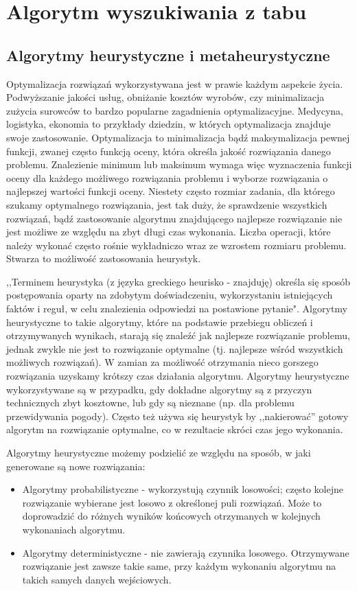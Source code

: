 

\chapter{Algorytm wyszukiwania z tabu}
\section{Algorytmy heurystyczne i metaheurystyczne}
 Optymalizacja rozwiązań wykorzystywana jest w prawie każdym aspekcie życia. Podwyższanie jakości usług, obniżanie kosztów wyrobów, czy minimalizacja zużycia surowców to bardzo popularne zagadnienia optymalizacyjne. Medycyna, logistyka, ekonomia to przykłady dziedzin, w których optymalizacja znajduje swoje zastosowanie. 
 Optymalizacja to minimalizacja bądź maksymalizacja pewnej funkcji, zwanej często funkcją oceny, która określa jakość rozwiązania danego problemu. Znalezienie minimum lub maksimum wymaga więc wyznaczenia funkcji oceny dla każdego możliwego rozwiązania problemu i wyborze rozwiązania o najlepszej wartości funkcji oceny. Niestety często rozmiar zadania, dla którego szukamy optymalnego rozwiązania, jest tak duży, że sprawdzenie wszystkich rozwiązań, bądź zastosowanie algorytmu znajdującego najlepsze rozwiązanie nie jest możliwe ze względu na zbyt długi czas wykonania. Liczba operacji, które należy wykonać często rośnie wykładniczo wraz ze wzrostem rozmiaru problemu. Stwarza to możliwość zastosowania heurystyk.
 
 ,,Terminem heurystyka (z języka greckiego heurisko - znajduję) określa się sposób postępowania oparty na zdobytym doświadczeniu, wykorzystaniu istniejących faktów i reguł, w celu znalezienia odpowiedzi na postawione pytanie"\cite{Algorytmy:Widuch}. Algorytmy heurystyczne to takie algorytmy, które na podstawie przebiegu obliczeń i otrzymywanych wynikach, starają się znaleźć jak najlepsze rozwiązanie problemu, jednak zwykle nie jest to rozwiązanie optymalne (tj. najlepsze wśród wszystkich możliwych rozwiązań). W zamian za możliwość otrzymania nieco gorszego rozwiązania uzyskamy krótszy czas działania algorytmu. Algorytmy heurystyczne wykorzystywane są w przypadku, gdy dokładne algorytmy są z przyczyn technicznych zbyt kosztowne, lub gdy są nieznane (np. dla problemu przewidywania pogody). Często też używa się heurystyk by ,,nakierować'' gotowy algorytm na rozwiązanie optymalne, co w rezultacie skróci czas jego wykonania.
 
 Algorytmy heurystyczne możemy podzielić ze względu na sposób, w jaki generowane są nowe rozwiązania:
 \begin{itemize}
 	\item Algorytmy probabilistyczne - wykorzystują czynnik losowości; często kolejne rozwiązanie wybierane jest losowo z określonej puli rozwiązań. Może to doprowadzić do różnych wyników końcowych otrzymanych w kolejnych wykonaniach algorytmu.
 	\item Algorytmy deterministyczne - nie zawierają czynnika losowego. Otrzymywane rozwiązanie jest zawsze takie same, przy każdym wykonaniu algorytmu na takich samych danych wejściowych. 	
 \end{itemize}

